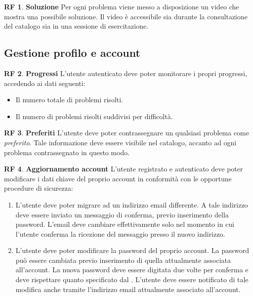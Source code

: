 \documentclass[11pt, a4paper]{article}
\theoremstyle{definition}
\newtheorem{funcreq}{RF} %
\begin{document}
\begin{funcreq}
\textbf{Soluzione }
Per ogni problema viene messo a disposizione un video che mostra una
possibile soluzione. Il video è accessibile sia durante la consultazione
del catalogo sia in una sessione di esercitazione.
\end{funcreq}

\subsection{Gestione profilo e account}

\begin{funcreq}
\label{stats}
\textbf{Progressi }
L'utente autenticato deve poter monitorare i propri progressi, accedendo ai dati
seguenti:
\begin{itemize}
    \item Il numero totale di problemi risolti.
    \item Il numero di problemi risolti suddivisi per difficoltà.
\end{itemize}
\end{funcreq}

\begin{funcreq}
\textbf{Preferiti }
L'utente deve poter contrassegnare un qualsiasi problema come \textit{preferito}.
Tale informazione deve essere visibile nel catalogo, accanto ad ogni problema
contrassegnato in questo modo.
\end{funcreq}


\begin{funcreq}
\label{updateaccount}
\textbf{Aggiornamento account }
L'utente registrato e autenticato deve poter modificare i dati chiave del
proprio account in conformità con le opportune procedure di sicurezza:
\begin{enumerate}
\item L'utente deve poter migrare ad un indirizzo email differente. A tale
indirizzo deve essere inviato un messaggio di conferma, previo inserimento
della password. L'email
deve cambiare effettivamente solo nel momento in cui l'utente conferma la
ricezione del messaggio presso il nuovo indirizzo.

\item L'utente deve poter modificare la password del proprio account.
La password può essere cambiata previo inserimento di quella attualmente
associata all'account. La nuova password deve essere digitata due volte
per conferma e deve rispettare quanto specificato dal . 
L'utente deve essere notificato di tale modifica anche tramite
l'indirizzo email attualmente associato all'account.
\end{enumerate}
\end{funcreq}
\end{document}
